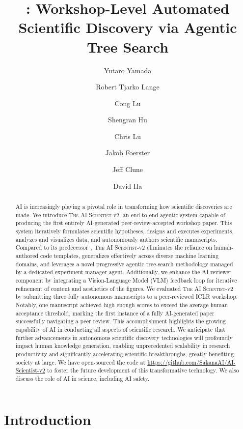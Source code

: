 \documentclass[11pt, a4paper]{include/gdm_format}
\title{\ouralgo: Workshop-Level Automated Scientific Discovery via Agentic Tree Search}
\author[1,*]{Yutaro Yamada}
\author[1,*]{Robert Tjarko Lange}
\author[1,2,3,*]{Cong Lu}
\author[1,2,3]{Shengran Hu}
\author[4]{Chris Lu}
\author[4]{Jakob Foerster}
\author[2,3,5,\Cross]{Jeff Clune}
\author[1,\Cross]{David Ha}
\affil[*]{Equal Contribution}
\affil[1]{Sakana AI}
\affil[2]{University of British Columbia}
\affil[3]{Vector Institute}
\affil[4]{FLAIR, University of Oxford}
\affil[5]{Canada CIFAR AI Chair}
\affil[\Cross]{Equal Advising}
\newcommand{\ouralgo}{\textsc{The AI Scientist-v2}\xspace}
\begin{document}
\begin{abstract}
AI is increasingly playing a pivotal role in transforming how scientific discoveries are made.
We introduce \ouralgo, an end-to-end agentic system capable of producing the first entirely AI-generated peer-review-accepted workshop paper.
This system iteratively formulates scientific hypotheses, designs and executes experiments, analyzes and visualizes data, and autonomously authors scientific manuscripts.
Compared to its predecessor~\citep[v1,][]{lu2024ai}, \ouralgo eliminates the reliance on human-authored code templates, generalizes effectively across diverse machine learning domains, and leverages a novel progressive agentic tree-search methodology managed by a dedicated experiment manager agent.
Additionally, we enhance the AI reviewer component by integrating a Vision-Language Model (VLM) feedback loop for iterative refinement of content and aesthetics of the figures.
We evaluated \ouralgo by submitting three fully autonomous manuscripts to a peer-reviewed ICLR workshop.
Notably, one manuscript achieved high enough scores to exceed the average human acceptance threshold, marking the first instance of a fully AI-generated paper successfully navigating a peer review.
This accomplishment highlights the growing capability of AI in conducting all aspects of scientific research.
We anticipate that further advancements in autonomous scientific discovery technologies will profoundly impact human knowledge generation, enabling unprecedented scalability in research productivity and significantly accelerating scientific breakthroughs, greatly benefiting society at large.
We have open-sourced the code at \url{https://github.com/SakanaAI/AI-Scientist-v2} to foster the future development of this transformative technology. We also discuss the role of AI in science, including AI safety.
\end{abstract}

\maketitle
\section{Introduction}
 
\end{document}
